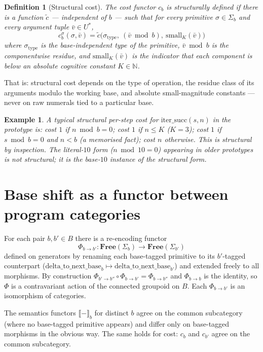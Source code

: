 \documentclass[11pt]{article}
\newtheorem{definition}{Definition}
\newtheorem{example}{Example}
\begin{document}
\begin{definition}[Structural cost]\label{def:structural}
The cost functor $c_b$ is \emph{structurally defined} if there is a
function $\tilde c$ — independent of $b$ — such that for every
primitive $\sigma \in \Sigma_b$ and every argument tuple
$\bar{v} \in U^*$,
\[
c_b^\sigma(\sigma, \bar{v}) = \tilde c\big(\sigma_{\mathrm{type}},\
(\bar{v} \bmod b),\ \mathrm{small}_K(\bar{v})\big)
\]
where $\sigma_{\mathrm{type}}$ is the base-independent type of the
primitive, $\bar v \bmod b$ is the componentwise residue, and
$\mathrm{small}_K(\bar v)$ is the indicator that each component is
below an absolute cognitive constant $K \in \mathbb{N}$.
\end{definition}

That is: structural cost depends on the type of operation, the
residue class of its arguments modulo the working base, and absolute
small-magnitude constants — never on raw numerals tied to a particular
base.

\begin{example}
A typical structural per-step cost for $\mathrm{iter\_succ}(s,n)$ in
the prototype is: cost $1$ if $n \bmod b = 0$; cost $1$ if $n \le K$
($K = 3$); cost $1$ if $s \bmod b = 0$ and $n < b$ (a memorised
fact); cost $n$ otherwise. This is structural by inspection. The
literal-$10$ form ($n \bmod 10 = 0$) appearing in older prototypes is
not structural; it is the base-$10$ instance of the structural form.
\end{example}

\section{Base shift as a functor between program categories}

For each pair $b, b' \in B$ there is a re-encoding functor
\[
\Phi_{b \to b'} : \mathbf{Free}(\Sigma_b) \longrightarrow
\mathbf{Free}(\Sigma_{b'})
\]
defined on generators by renaming each base-tagged primitive to its
$b'$-tagged counterpart ($\mathrm{delta\_to\_next\_base}_b \mapsto
\mathrm{delta\_to\_next\_base}_{b'}$) and extended freely to all
morphisms. By construction $\Phi_{b' \to b''} \circ \Phi_{b \to b'} =
\Phi_{b \to b''}$ and $\Phi_{b \to b}$ is the identity, so $\Phi$ is a
contravariant action of the connected groupoid on $B$. Each
$\Phi_{b \to b'}$ is an isomorphism of categories.

The semantics functors $\llbracket - \rrbracket_b$ for distinct $b$
agree on the common subcategory (where no base-tagged primitive
appears) and differ only on base-tagged morphisms in the obvious
way. The same holds for cost: $c_b$ and $c_{b'}$ agree on the common
subcategory.
\end{document}

